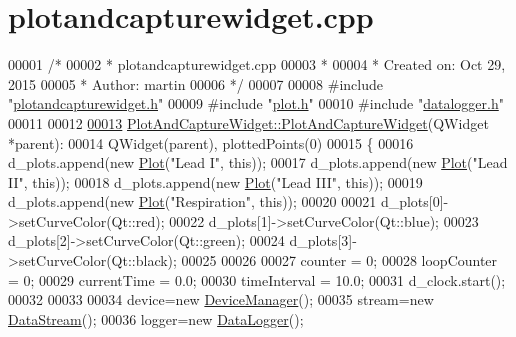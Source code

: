 \hypertarget{plotandcapturewidget_8cpp_source}{}\section{plotandcapturewidget.\+cpp}
\label{plotandcapturewidget_8cpp_source}

\begin{DoxyCode}
00001 \textcolor{comment}{/*}
00002 \textcolor{comment}{ * plotandcapturewidget.cpp}
00003 \textcolor{comment}{ *}
00004 \textcolor{comment}{ *  Created on: Oct 29, 2015}
00005 \textcolor{comment}{ *      Author: martin}
00006 \textcolor{comment}{ */}
00007 
00008 \textcolor{preprocessor}{#include "\hyperlink{plotandcapturewidget_8h}{plotandcapturewidget.h}"}
00009 \textcolor{preprocessor}{#include "\hyperlink{plot_8h}{plot.h}"}
00010 \textcolor{preprocessor}{#include "\hyperlink{datalogger_8h}{datalogger.h}"}
00011 
00012 
\hypertarget{plotandcapturewidget_8cpp_source.tex_l00013}{}\hyperlink{classPlotAndCaptureWidget_a12b93ad83cddd745f19c4745a9aa7af9}{00013} \hyperlink{classPlotAndCaptureWidget_a12b93ad83cddd745f19c4745a9aa7af9}{PlotAndCaptureWidget::PlotAndCaptureWidget}(QWidget *parent):
00014 QWidget(parent), plottedPoints(0)
00015 \{
00016             d\_plots.append(\textcolor{keyword}{new} \hyperlink{classPlot}{Plot}(\textcolor{stringliteral}{"Lead I"}, \textcolor{keyword}{this}));
00017             d\_plots.append(\textcolor{keyword}{new} \hyperlink{classPlot}{Plot}(\textcolor{stringliteral}{"Lead II"}, \textcolor{keyword}{this}));
00018             d\_plots.append(\textcolor{keyword}{new} \hyperlink{classPlot}{Plot}(\textcolor{stringliteral}{"Lead III"}, \textcolor{keyword}{this}));
00019             d\_plots.append(\textcolor{keyword}{new} \hyperlink{classPlot}{Plot}(\textcolor{stringliteral}{"Respiration"}, \textcolor{keyword}{this}));
00020 
00021             d\_plots[0]->setCurveColor(Qt::red);
00022             d\_plots[1]->setCurveColor(Qt::blue);
00023             d\_plots[2]->setCurveColor(Qt::green);
00024             d\_plots[3]->setCurveColor(Qt::black);
00025 
00026 
00027             counter = 0;
00028             loopCounter = 0;
00029             currentTime = 0.0;
00030             timeInterval = 10.0;
00031             d\_clock.start();
00032 
00033 
00034             device=\textcolor{keyword}{new} \hyperlink{classDeviceManager}{DeviceManager}();
00035             stream=\textcolor{keyword}{new} \hyperlink{classDataStream}{DataStream}();
00036                logger=\textcolor{keyword}{new} \hyperlink{classDataLogger}{DataLogger}();

\end{DoxyCode}
